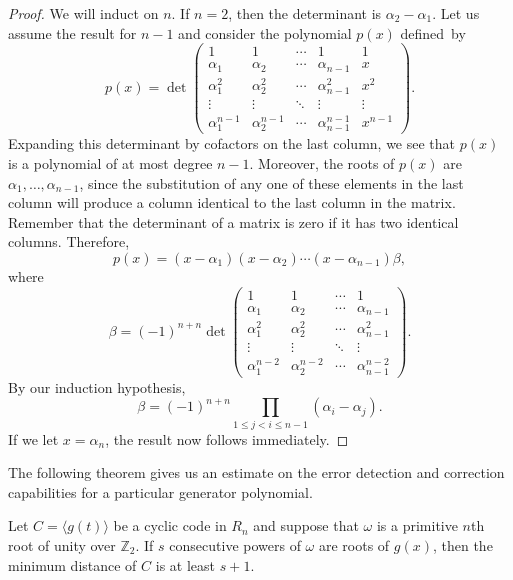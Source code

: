 \begin{proof}
We will induct on $n$. If $n = 2$, then the determinant is $\alpha_2 - \alpha_1$.  Let us assume the result for $n  - 1$ and consider the polynomial $p(x)$ defined~by
$$
p(x)
=
\det
\left(
\begin{array}{ccccc}
1              & 1              & \cdots & 1              & 1 \\
\alpha_1       & \alpha_2       & \cdots & \alpha_{n-1}   & x \\
\alpha_1^2     & \alpha_2^2     & \cdots & \alpha_{n-1}^2 & x^2 \\
\vdots         & \vdots         & \ddots & \vdots         & \vdots \\
\alpha_1^{n-1} & \alpha_2^{n-1} & \cdots & \alpha_{n-1}^{n-1} & x^{n-1}
\end{array}
\right).
$$
Expanding this determinant by cofactors on the last column, we see that $p(x)$ is a polynomial of at most degree $n-1$.  Moreover, the roots of $p(x)$ are $\alpha_1, \ldots, \alpha_{n-1}$, since the substitution of any one of these elements in the last column will produce a column identical to the last column in the matrix.  Remember that the determinant of a matrix is zero if it has two identical columns. Therefore,     
$$
p(x) = (x - \alpha_1)(x - \alpha_2) \cdots (x - \alpha_{n-1}) \beta, 
$$
where
$$
\beta = (-1)^{n+n}
\det
\left(
\begin{array}{cccc}
1              & 1              & \cdots & 1 \\
\alpha_1       & \alpha_2       & \cdots & \alpha_{n-1} \\
\alpha_1^2     & \alpha_2^2     & \cdots & \alpha_{n-1}^2 \\
\vdots         & \vdots         & \ddots & \vdots \\
\alpha_1^{n-2} & \alpha_2^{n-2} & \cdots & \alpha_{n-1}^{n-2} 
\end{array}
\right).
$$
By our induction hypothesis,
$$
\beta = (-1)^{n+n} \prod_{1 \leq j < i \leq n-1} (\alpha_i - \alpha_j).
$$
If we let $x = \alpha_n$, the result now follows immediately.
\end{proof}

\medskip

The following theorem gives us an estimate on the error detection and correction capabilities for a particular generator polynomial.

\begin{theorem}
Let $C = \langle g(t) \rangle$ be a cyclic code in $R_n$ and suppose that $\omega$ is a primitive $n$th root of unity over ${\mathbb Z}_2$.  If $s$ consecutive powers of $\omega$ are roots of $g(x)$, then the minimum distance of $C$ is at least $s+1$.
\end{theorem}



